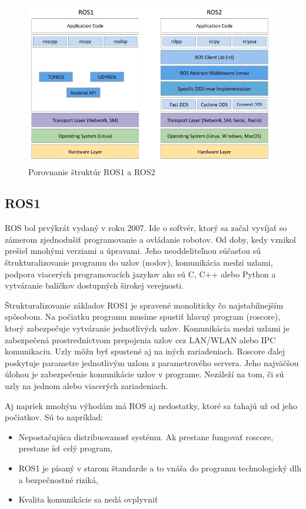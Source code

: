 \begin{figure}[!htbp]
	\centering
	\includegraphics[width=15cm]{img/strukturaRos1Ros2.png}
	\caption{Porovnanie štruktúr ROS1 a ROS2 \cite{comparison}}
	\label{fig:struktury}
\end{figure}

\pagebreak

\subsection{ROS1}

\noindent ROS bol prvýkrát vydaný v roku 2007. Ide o softvér, ktorý sa začal vyvíjať so zámerom zjednodušiť programovanie a ovládanie robotov. Od doby,
kedy vznikol prešiel mnohými verziami a úpravami. Jeho neoddeliteľnou súčasťou sú štrukturalizovanie programu do uzlov (nodov), komunikácia medzi uzlami,
podpora viacerých programovacích jazykov ako sú C, C++ alebo Python a vytváranie balíčkov dostupných širokej verejnosti.

Štrukturalizovanie základov ROS1 je spravené monoliticky čo najstabilnejším spôsobom. Na počiatku programu musíme spustiť hlavný program (roscore),
ktorý zabezpečuje vytváranie jednotlivých uzlov. Komunikácia medzi uzlami je zabezpečená prostredníctvom prepojenia uzlov cez LAN/WLAN alebo IPC komunikaciu.
Uzly môžu byť spustené aj na iných zariadeniach. Roscore ďalej poskytuje parametre jednotlivým uzlom z parametrového servera. Jeho najväčšou úlohou je zabezpečenie
komunikácie uzlov v programe. Nezáleží na tom, či sú uzly na jednom alebo viacerých zariadeniach.

\pagebreak

Aj napriek mnohým výhodám má ROS aj nedostatky, ktoré sa ťahajú už od jeho počiatkov. Sú to napríklad:
\begin{itemize}
	\item Nepostačujúca distribuovanosť systému. Ak prestane fungovať roscore, prestane ísť celý program,
	\item ROS1 je písaný v starom štandarde a to vnáša do programu technologický dlh a bezpečnostné riziká,
	\item Kvalita komunikácie sa nedá ovplyvniť
\end{itemize}

